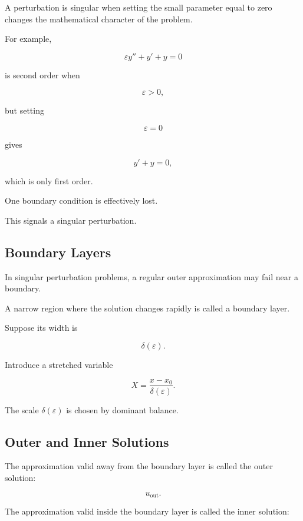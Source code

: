 A perturbation is singular when setting the small parameter equal to zero
changes the mathematical character of the problem.

For example,

\[
\boxed{
\varepsilon y''+y'+y=0
}
\]

is second order when

\[
\varepsilon>0,
\]

but setting

\[
\varepsilon=0
\]

gives

\[
y'+y=0,
\]

which is only first order.

One boundary condition is effectively lost.

This signals a singular perturbation.

\subsection{Boundary Layers}
\label{subsec:boundary-layers}

In singular perturbation problems, a regular outer approximation may fail
near a boundary.

A narrow region where the solution changes rapidly is called a boundary
layer.

Suppose its width is

\[
\delta(\varepsilon).
\]

Introduce a stretched variable

\[
\boxed{
X
=
\frac{x-x_0}{\delta(\varepsilon)}.
}
\]

The scale \(\delta(\varepsilon)\) is chosen by dominant balance.

\subsection{Outer and Inner Solutions}
\label{subsec:outer-inner-solutions}

The approximation valid away from the boundary layer is called the outer
solution:

\[
\boxed{
u_{\mathrm{out}}.
}
\]

The approximation valid inside the boundary layer is called the inner
solution:

